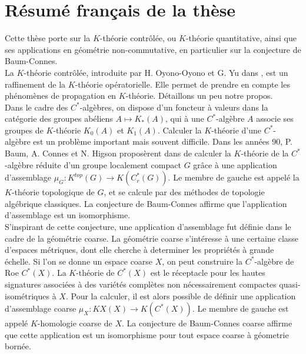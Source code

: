 \section*{Résumé français de la thèse}

Cette thèse porte sur la $K$-théorie contrôlée, ou $K$-théorie quantitative, ainsi que ses applications en géométrie non-commutative, en particulier sur la conjecture de Baum-Connes.\\

La $K$-théorie contrôlée, introduite par H. Oyono-Oyono et G. Yu dans \cite{OY2}, est un raffinement de la $K$-théorie opératorielle. Elle permet de prendre en compte les phénomènes de propagation en $K$-théorie. Détaillons un peu notre propos.\\

Dans le cadre des $C^*$-algèbres, on dispose d'un foncteur à valeurs dans la catégorie des groupes abéliens $A\mapsto K_*(A)$, qui à une $C^*$-algèbre $A$ associe ses groupes de $K$-théorie $K_0(A)$ et $K_1(A)$. Calculer la $K$-théorie d'une $C^*$-algèbre est un problème important mais souvent difficile. Dans les années 90, P. Baum, A. Connes et N. Higson proposèrent dans \cite{BaumConnesHigson} de calculer la $K$-théorie de la $C^*$-algèbre réduite d'un groupe localement compact $G$ grâce à une application d'assemblage $\mu_G : K^{top}(G)\rightarrow K(C_r^*(G))$. Le membre de gauche est appelé la $K$-théorie topologique de $G$, et se calcule par des méthodes de topologie algébrique classiques. La conjecture de Baum-Connes affirme que l'application d'assemblage est un isomorphisme.\\

S'inspirant de cette conjecture, une application d'assemblage fut définie dans le cadre de la géométrie coarse. La géométrie coarse s'intéresse à une certaine classe d'espaces métriques, dont elle cherche à determiner les propriétés à grande échelle. Si l'on se donne un espace coarse $X$, on peut construire la $C^*$-algèbre de Roe $C^*(X)$. La $K$-théorie de $C^*(X)$ est le réceptacle pour les hautes signatures associées à des variétés complètes non nécessairement compactes quasi-isométriques à $X$. Pour la calculer, il est alors possible de définir une application d'assemblage coarse $\mu_X : KX(X)\rightarrow K(C^*(X))$. Le membre de gauche est appelé $K$-homologie coarse de $X$. La conjecture de Baum-Connes coarse affirme que cette application est un isomorphisme pour tout espace coarse à géometrie bornée.\\

